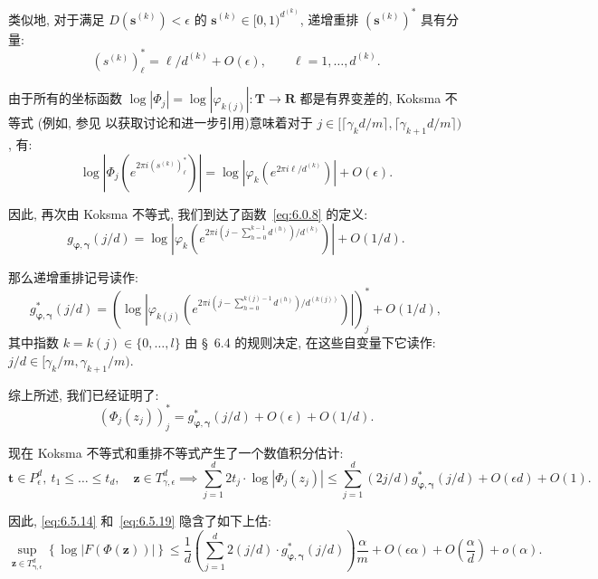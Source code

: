 类似地, 对于满足 $D(\mathbf{s}^{(k)}) < \epsilon$ 的 $\mathbf{s}^{(k)} \in [0,1)^{d^{(k)}}$, 递增重排 $(\mathbf{s}^{(k)})^*$ 具有分量:
\begin{equation}\label{eq:6.5.17}
(s^{(k)})_{\ell}^* = \ell/d^{(k)} + O(\epsilon), \qquad \ell = 1, \dots, d^{(k)}.
\end{equation}

由于所有的坐标函数 $\log |\Phi_j| = \log |\varphi_{k(j)}| : \mathbf{T} \to \mathbf{R}$ 都是有界变差的, Koksma 不等式 (例如, 参见 \cite[§ 2.5.1]{CDT21} 以获取讨论和进一步引用)意味着对于 $j \in [\lceil \gamma_k d/m \rceil, \lceil \gamma_{k+1} d/m \rceil)$, 有:
\[ \log |\Phi_j(e^{2\pi i(s^{(k)})_{\ell}^*})| = \log |\varphi_k(e^{2\pi i\ell/d^{(k)}})| + O(\epsilon). \]

因此, 再次由 Koksma 不等式, 我们到达了函数~\eqref{eq:6.0.8} 的定义:
\[ g_{\boldsymbol{\varphi},\boldsymbol{\gamma}}(j/d) = \log \left| \varphi_k \left( e^{2\pi i \left( j - \sum_{h=0}^{k-1} d^{(h)} \right) / d^{(k)}} \right) \right| + O(1/d). \]

那么递增重排记号读作:
\begin{equation}\label{eq:6.5.18}
g_{\boldsymbol{\varphi},\boldsymbol{\gamma}}^*(j/d) = \left(\log \left| \varphi_{k(j)} \left( e^{2\pi i \left( j - \sum_{h=0}^{k(j)-1} d^{(h)} \right) / d^{(k(j))}} \right) \right| \right)_j^* + O(1/d),
\end{equation}
其中指数 $k = k(j) \in \{0, \dots, l\}$ 由 \S~6.4 的规则决定, 在这些自变量下它读作: $j/d \in [\gamma_k/m, \gamma_{k+1}/m)$.

综上所述, 我们已经证明了:
\[ (\Phi_j(z_j))_j^* = g_{\boldsymbol{\varphi},\boldsymbol{\gamma}}^*(j/d) + O(\epsilon) + O(1/d). \]

现在 Koksma 不等式和重排不等式产生了一个数值积分估计:
\begin{equation}\label{eq:6.5.19}
\mathbf{t} \in P_{\epsilon}^{d}, \ t_{1} \leq \dots \leq t_{d}, \quad \mathbf{z} \in T_{\gamma, \epsilon}^{d} \implies \sum_{j=1}^{d} 2t_{j} \cdot \log |\Phi_{j}(z_{j})| \leq \sum_{j=1}^{d} (2j/d) g_{\boldsymbol{\varphi}, \boldsymbol{\gamma}}^{*}(j/d) + O(\epsilon d) + O(1).
\end{equation}

因此, \eqref{eq:6.5.14} 和~\eqref{eq:6.5.19} 隐含了如下上估:
\begin{equation}\label{eq:6.5.20}
\sup_{\mathbf{z} \in T_{\boldsymbol{\gamma}, \epsilon}^{d}} \left\{ \log |F(\Phi(\mathbf{z}))| \right\} \le \frac{1}{d} \left( \sum_{j=1}^{d} 2(j/d) \cdot g_{\boldsymbol{\varphi}, \boldsymbol{\gamma}}^{*}(j/d) \right) \frac{\alpha}{m} + O(\epsilon \alpha) + O\left(\frac{\alpha}{d}\right) + o(\alpha).
\end{equation}

